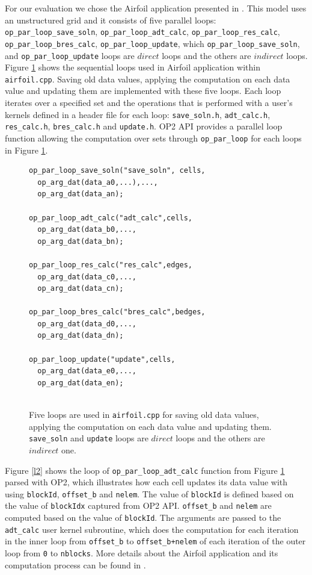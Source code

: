 \documentclass[conference]{IEEEtran}
\begin{document}
For our evaluation we chose the Airfoil application presented in \cite{o8}. This model uses an unstructured grid and it consists of five parallel loops: \texttt{op\_par\_loop\_save\_soln}, \texttt{op\_par\_loop\_adt\_calc}, \texttt{op\_par\_loop\_res\_calc}, \texttt{op\_par\_loop\_bres\_calc}, \texttt{op\_par\_loop\_update}, which \texttt{op\_par\_loop\_save\_soln},  and \texttt{op\_par\_loop\_update} loops are $direct$ loops and the others are $indirect$ loops. Figure \ref{l1} shows the sequential loops used in Airfoil application within \texttt{airfoil.cpp}. Saving old data values, applying the computation on each data value and updating them are implemented with these five loops. Each loop iterates over a specified set and the operations that is performed with a user's kernels defined in a header file for each loop: \texttt{save\_soln.h}, \texttt{adt\_calc.h}, \texttt{res\_calc.h}, \texttt{bres\_calc.h} and \texttt{update.h}.  OP2 API provides a parallel loop function allowing the computation over sets through \texttt{op\_par\_loop} for each loops in Figure \ref{l1}. 

\begin{figure} [!h]
    \begin{lstlisting}
op_par_loop_save_soln("save_soln", cells,
  op_arg_dat(data_a0,...),...,
  op_arg_dat(data_an);
  
op_par_loop_adt_calc("adt_calc",cells,
  op_arg_dat(data_b0,...,
  op_arg_dat(data_bn);
  
op_par_loop_res_calc("res_calc",edges,
  op_arg_dat(data_c0,...,
  op_arg_dat(data_cn);

op_par_loop_bres_calc("bres_calc",bedges,
  op_arg_dat(data_d0,...,
  op_arg_dat(data_dn);
  
op_par_loop_update("update",cells,
  op_arg_dat(data_e0,...,
  op_arg_dat(data_en);
  
    \end{lstlisting}
    \caption{\small{Five loops are used in \texttt{airfoil.cpp} for saving old data values, applying the computation on each data value and updating them. \texttt{save\_soln} and \texttt{update} loops are $direct$ loops and the others are $indirect$ one.}}
    \label{l1}
\end{figure}


Figure \ref{l2} shows the loop of \texttt{op\_par\_loop\_adt\_calc} function from Figure \ref{l1} parsed with OP2, which illustrates how each cell updates its data value with using \texttt{blockId}, \texttt{offset\_b} and \texttt{nelem}. The value of \texttt{blockId} is defined based on the value of \texttt{blockIdx} captured from OP2 API.  \texttt{offset\_b} and \texttt{nelem} are computed based on the value of \texttt{blockId}. The arguments are passed to the \texttt{adt\_calc} user kernel subroutine, which does the computation for each iteration in the inner loop from \texttt{offset\_b} to \texttt{offset\_b+nelem} of each iteration of the outer loop from \texttt{0} to \texttt{nblocks}. More details about the Airfoil application and its computation process can be found in \cite{o8}.
\end{document}
